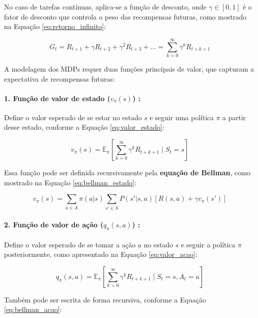 No caso de tarefas contínuas, aplica-se a função de desconto, onde \(\gamma \in [0, 1]\) é o fator de desconto que controla o peso das recompensas futuras, como mostrado na Equação \ref{eq:retorno_infinito}:

\begin{equation}
\label{eq:retorno_infinito}
G_t = R_{t+1} + \gamma R_{t+2} + \gamma^2 R_{t+3} + \dots = \sum_{k=0}^{\infty} \gamma^k R_{t+k+1}
\end{equation}

A modelagem dos MDPs requer duas funções principais de valor, que capturam a expectativa de recompensas futuras:

\paragraph{1. Função de valor de estado (\(v_\pi(s)\)) \cite{sutton}:}
Define o valor esperado de se estar no estado \(s\) e seguir uma política \(\pi\) a partir desse estado, conforme a Equação \ref{eq:valor_estado}:

\begin{equation}
\label{eq:valor_estado}
v_\pi(s) = \mathbb{E}_\pi \left[ \sum_{k=0}^{\infty} \gamma^k R_{t+k+1} \mid S_t = s \right]
\end{equation}

Essa função pode ser definida recursivamente pela \textbf{equação de Bellman}, como mostrado na Equação \ref{eq:bellman_estado}:

\begin{equation}
\label{eq:bellman_estado}
v_\pi(s) = \sum_{a \in A} \pi(a|s) \sum_{s' \in S} P(s'|s, a) \left[ R(s, a) + \gamma v_\pi(s') \right]
\end{equation}

\paragraph{2. Função de valor de ação (\(q_\pi(s, a)\)) \cite{sutton}:}
Define o valor esperado de se tomar a ação \(a\) no estado \(s\) e seguir a política \(\pi\) posteriormente, como apresentado na Equação \ref{eq:valor_acao}:

\begin{equation}
\label{eq:valor_acao}
q_\pi(s, a) = \mathbb{E}_\pi \left[ \sum_{k=0}^{\infty} \gamma^k R_{t+k+1} \mid S_t = s, A_t = a \right]
\end{equation}

Também pode ser escrita de forma recursiva, conforme a Equação \ref{eq:bellman_acao}:

